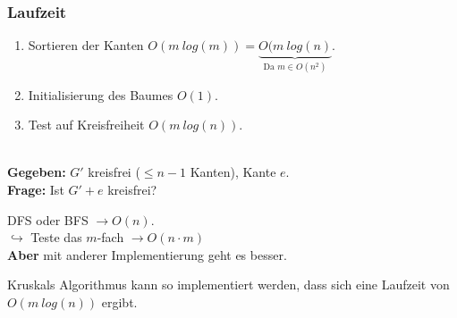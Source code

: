 \subsubsection*{Laufzeit}
\begin{enumerate}
	\item Sortieren der Kanten $O(m~log(m)) = \underbrace{O(m~log(n)}_{\text{Da } m \in O(n^2)}$.\vspace*{-13pt}
	\item Initialisierung des Baumes $O(1)$.
	\item Test auf Kreisfreiheit $O(m~log(n))$.
\end{enumerate}
\begin{problem}~\\[5pt]
	\hspace*{10pt}\textbf{Gegeben: } $G'$ kreisfrei ($\le n-1$ Kanten), Kante $e$.\\[5pt]
	\hspace*{10pt}\textbf{Frage: } Ist $G' + e$ kreisfrei?
\end{problem}
DFS oder BFS $\to O(n)$.\\
$\hookrightarrow$ Teste das $m$-fach $\to O(n\cdot m)$\\
\textbf{Aber} mit anderer Implementierung geht es besser.
\begin{satz}
	Kruskals Algorithmus kann so implementiert werden, dass sich eine Laufzeit von $O(m~log(n))$ ergibt.
\end{satz}
